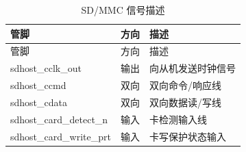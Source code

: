 \begin{longtable}[c]{ |p{3.5cm}|p{4cm}|p{8cm}| }
\caption{SD/MMC 信号描述} \label{tab:sdhost-signal-description}\\
\hline
\rowcolor{lightgray}
管脚 & 方向 & 描述 \\
\hline
\endfirsthead
\hline
\rowcolor{lightgray}
管脚 & 方向 & 描述  \\
\hline
\endhead
\endfoot
sdhost\_cclk\_out & 输出 & 向从机发送时钟信号	\\\hline
sdhost\_ccmd & 双向 & 双向命令/响应线  \\\hline
sdhost\_cdata & 双向 & 双向数据读/写线	\\\hline
sdhost\_card\_detect\_n & 输入 &  卡检测输入线 \\\hline
sdhost\_card\_write\_prt & 输入 & 卡写保护状态输入 	\\\hline
\end{longtable}
